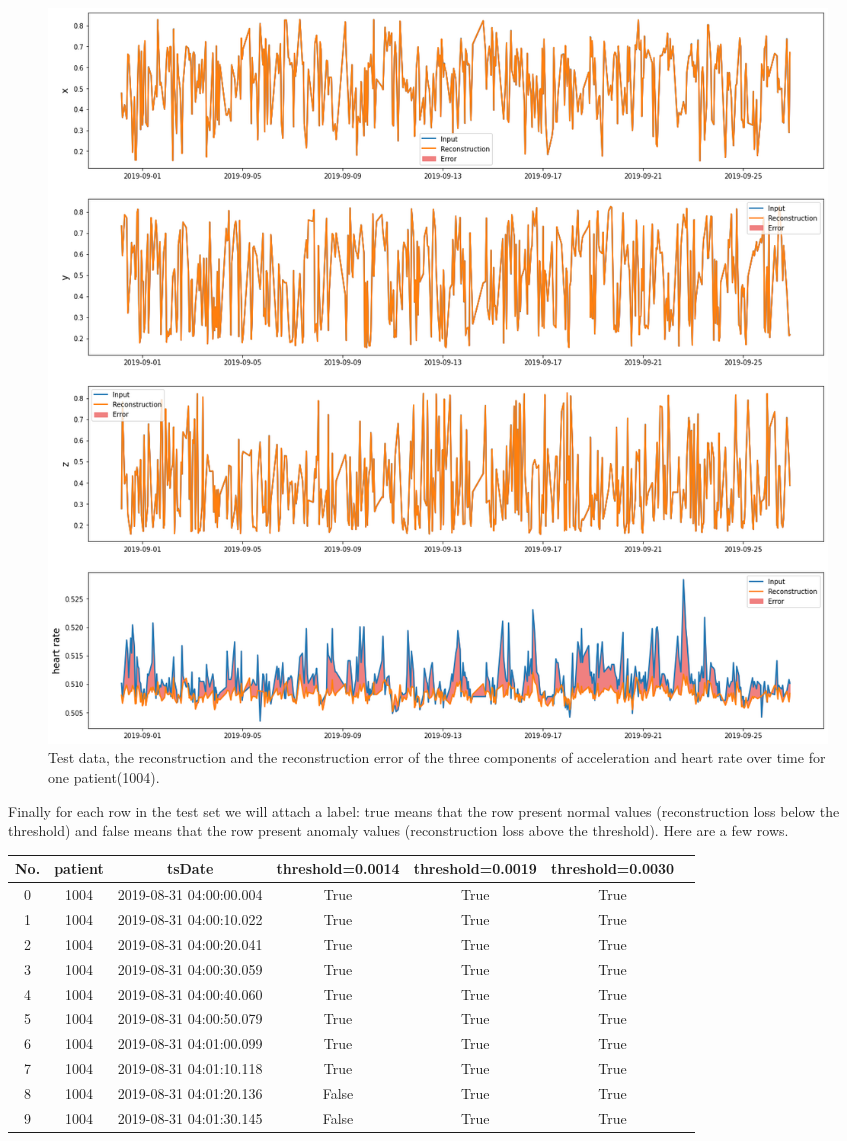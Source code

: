 \begin{figure}[H]
\centering
  \includegraphics[scale=0.35]{img/task_2/reconstructions_test.png}
  \caption{Test data, the reconstruction and the reconstruction error of the three components of acceleration and heart rate over time for one patient(1004).}
  \label{fig: rec test}
\end{figure}

Finally for each row in the test set we will attach a label: true means that the row present normal values (reconstruction loss below the threshold) and false means that the row present anomaly values (reconstruction loss above the threshold). Here are a few rows.

\begin{center}
\begin{tabular}{| c | c | c | c | c | c | c |} 
\hline
No. & patient & tsDate & threshold=0.0014 & threshold=0.0019 & threshold=0.0030 \\ [0.5ex] 
\hline
\hline
0 &	1004 & 2019-08-31 04:00:00.004 & True & True & True \\
\hline
1 &	1004 & 2019-08-31 04:00:10.022 & True & True & True \\
\hline
2 &	1004 & 2019-08-31 04:00:20.041 & True & True & True \\
\hline
3 &	1004 & 2019-08-31 04:00:30.059 & True & True & True \\
\hline
4 &	1004 & 2019-08-31 04:00:40.060 & True & True & True \\
\hline
5 &	1004 & 2019-08-31 04:00:50.079 & True & True & True \\
\hline
6 &	1004 & 2019-08-31 04:01:00.099 & True & True & True \\
\hline
7 &	1004 & 2019-08-31 04:01:10.118 & True & True & True \\
\hline
8 &	1004 & 2019-08-31 04:01:20.136 & False & True & True \\
\hline
9 &	1004& 2019-08-31 04:01:30.145 & False & True & True \\ [1ex] 
\hline
\end{tabular}
\end{center}

